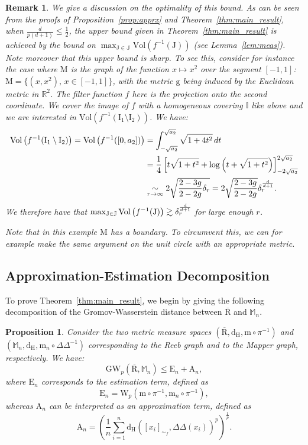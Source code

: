 \documentclass[pdflatex,sn-mathphys-ay]{sn-jnl}%
\newtheorem{proposition}{Proposition}[section]
\newtheorem{remark}{Remark}
\newcommand{\reeb}{\mathrm{R}}
\newcommand{\man}{\mathrm{M}}
\newcommand{\mes}{\mathrm{m}}
\newcommand{\wasser}{\mathrm{W}}
\newcommand{\gromov}{\mathrm{GW}}
\newcommand{\appr}{{\mathrm {A}}}
\newcommand{\estim}{{\mathrm {E}}}
\newcommand{\haus}{{\mathrm {d_H}}}
\newcommand{\interv}{{\mathrm {I}}}
\newcommand{\mapper}{{\mathbb{M}_n}}
\newcommand{\DD}{\Delta\!\!\!\!\Delta}
\newcommand{\diracn}{\mathrm{m}_n}
\newcommand{\vol}{\mathrm{Vol}}
\newcommand{\coverwidth}{\change{\delta_r}}
\newcommand{\g}{\mathrm{g}}
\newcommand{\R}{\mathbb{R}}
\newcommand{\preim}[2]{#1^{-1}(#2)}
\newcommand{\change}[1]{\noindent #1}
\theoremstyle{thmstyleone}%
\begin{document}
\begin{remark}We give a discussion on the optimality of this bound. As can be seen from the proofs of Proposition~\ref{prop:apprx} and Theorem~\ref{thm:main_result}, when $\frac{d}{p(d+1)}\leq\frac{1}{2}$, the upper bound given in Theorem~\ref{thm:main_result} is achieved by the bound on $\max_{\mathrm{J}\in\mathbb{J}}\vol\left( \preim{f}{\mathrm{J}}\right)$ (see Lemma~\ref{lem:meas}). Note moreover that this upper bound is sharp. To see this, consider for instance the case where $\man$ is the graph of the function $x\mapsto x^2$ over the segment $[-1,1]$: $\man=\{(x,x^2),\,x\in[-1,1]\}$, with the metric $\g$ being induced by the Euclidean metric in $\R^2$. The filter function $f$ here is the projection onto the second coordinate. We cover the image of $f$ with a homogeneous covering $\mathbb{I}$ like above and we are interested in $\vol\left( \preim{f}{\interv_1\setminus\interv_2}\right)$. 
We have:
\begin{align*}
\vol\left( \preim{f}{\interv_1\setminus\interv_2}\right)=\vol\left( \preim{f}{[0,a_2]}\right)&=\int_{-\sqrt{a_2}}^{\sqrt{a_2}}\sqrt{1+4t^2}\,dt\\
&=\frac{1}{4}\left[t\sqrt{1+t^2}+\log\left(t+\sqrt{1+t^2}\right)\right]^{2\sqrt{a_2}}_{-2\sqrt{a_2}}\\
&\underset{r\rightarrow\infty}{\sim}2\sqrt{\frac{2-3g}{2-2g}\coverwidth}=2\sqrt{\frac{2-3g}{2-2g}}\coverwidth^{\frac{d}{d+1}}.
\end{align*}
We therefore have that $\max_{\mathrm{J}\in\mathbb{J}}\vol\left( \preim{f}{\mathrm{J}}\right)\gtrsim\coverwidth^{\frac{d}{d+1}}$ for large enough $r$.

Note that in this example $\man$ has a boundary. \change{To circumvent this, we can for example make the same argument on the unit circle with an appropriate metric.}
\end{remark}




\subsection{Approximation-Estimation Decomposition}
\change{To prove Theorem~\ref{thm:main_result}, we begin by giving the following decomposition of the Gromov-Wasserstein distance between $\overline{\reeb}$ and $\mapper$.}
\begin{proposition}\label{prop:reeb_mapper}
 Consider the two metric measure spaces $(\overline{\reeb},\haus,\mes\circ\pi^{-1})$ and $(\mapper,\haus,\diracn\circ\DD^{-1})$ corresponding to the Reeb graph and to the Mapper graph, respectively. \change{We have:
 $$\gromov_p(\overline{\reeb},\mapper)\leq \estim_n+\appr_n,$$
where $\estim_n$ corresponds to the estimation term, defined as
 $$\estim_n=\wasser_p(\mes\circ\pi^{-1},\diracn\circ\pi^{-1}),$$
whereas $\appr_n$ can be interpreted as an approximation term, defined as $$\appr_n=\left(\frac{1}{n}\sum_{i=1}^n\haus([x_i]_{\sim_f},\DD(x_i))^p\right)^{\frac{1}{p}}.$$
 }
 
 \end{proposition}
 
\end{document}
